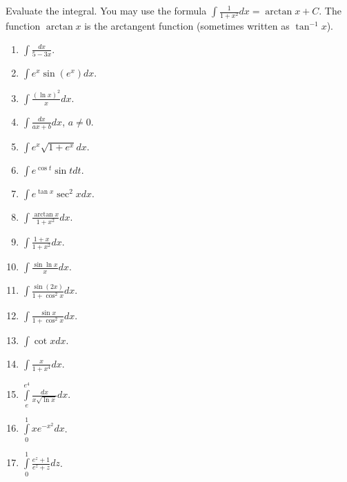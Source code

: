\begin{problem}
Evaluate the integral. You may use the formula $\int \frac{1}{1+x^2}dx=\arctan x+C $. The function $\arctan x$ is the arctangent function (sometimes written as $\tan^{-1}x$).
\begin{multicols}{3}
\begin{enumerate}
\item $\displaystyle\int \frac{dx}{5-3x}$.
\item $\displaystyle\int e^x\sin (e^x) dx$.
\item $\displaystyle\int \frac{(\ln x)^2}{x} dx$.
\item $\displaystyle\int \frac{dx}{ax+b} dx$, $a\neq 0$.
\item $\displaystyle\int e^x\sqrt{1+e^x} dx$.
\item $\displaystyle\int e^{\cos t }\sin t dt$.
\item $\displaystyle\int e^{\tan x}\sec^2x dx$.
\item $\displaystyle\int \frac{\arctan x}{1+x^2} dx$. 
\item $\displaystyle\int \frac{1+x}{1+x^2} dx$. 
\item $\displaystyle\int \frac{\sin \ln x}{x} dx$.
\item $\displaystyle\int \frac{\sin (2x)}{1+\cos^2x}dx$.
\item $\displaystyle\int \frac{\sin x}{1+\cos^2 x} dx$.
\item $\displaystyle\int \cot x dx$.
\item $\displaystyle\int \frac{x}{1+x^4}dx$.
\item $\displaystyle\int\limits_{e}^{e^4}\frac{dx}{x\sqrt{\ln x}} dx$.
\item $\displaystyle\int\limits_{0}^{1}xe^{-x^2} dx$.
\item $\displaystyle\int\limits_{0}^{1}\frac{e^z+1}{e^z+z} dz$.
\end{enumerate}
\end{multicols}
\end{problem}